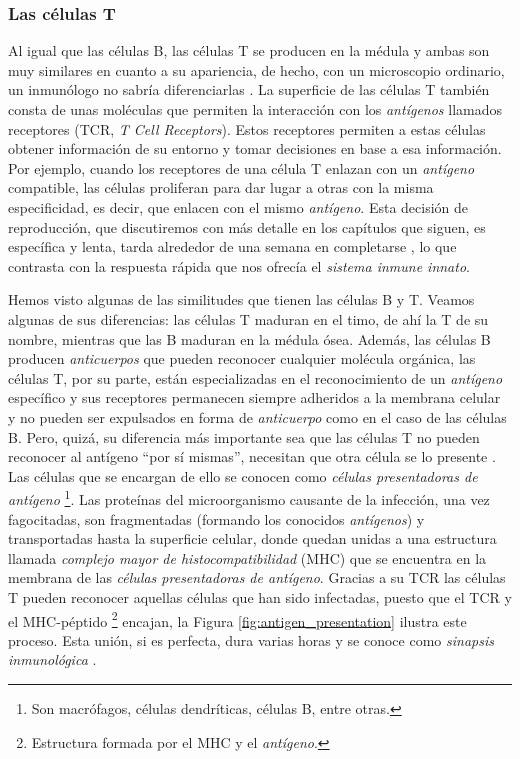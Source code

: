 \subsubsection{Las células T}
\label{Tcell}

Al igual que las células B, las células T se producen en la médula y ambas son muy similares en  cuanto a su apariencia, de hecho, con un microscopio ordinario, un inmunólogo no sabría diferenciarlas \citep{theHowItWorks}. La superficie de las células T también consta de unas moléculas que permiten la interacción con los \textit{antígenos} llamados receptores (TCR, \textit{T Cell Receptors}). Estos receptores permiten a estas células obtener información de su entorno y tomar decisiones en base a esa información. Por ejemplo, cuando los receptores de una célula T enlazan con un \textit{antígeno} compatible, las células proliferan para dar lugar a otras con la misma especificidad, es decir, que enlacen con el mismo \textit{antígeno}. Esta decisión de reproducción, que discutiremos con más detalle en los capítulos que siguen, es específica y lenta, tarda alrededor de una semana en completarse \citep{theHowItWorks}, lo que contrasta con la respuesta rápida que nos ofrecía el \textit{sistema inmune innato}.

Hemos visto algunas de las similitudes que tienen las células B y T. Veamos algunas de sus diferencias: las células T maduran en el timo, de ahí la T de su nombre, mientras que las B maduran en la médula ósea. Además, las células B producen \textit{anticuerpos} que pueden reconocer cualquier molécula orgánica, las células T, por su parte, están especializadas en el reconocimiento de un \textit{antígeno} específico y sus receptores permanecen siempre adheridos a la membrana celular y no pueden ser expulsados en forma de \textit{anticuerpo} como en el caso de las células B. Pero, quizá, su diferencia más importante sea que las células T no pueden reconocer al antígeno ``por sí mismas'', necesitan que otra célula se lo presente \citep{theHowItWorks}. Las células que se encargan de ello se conocen como \textit{células presentadoras de antígeno} \footnote{Son macrófagos, células dendríticas, células B, entre otras.}. Las proteínas del microorganismo causante de la infección, una vez fagocitadas, son fragmentadas (formando los conocidos \textit{antígenos}) y transportadas hasta la superficie celular, donde quedan unidas a una estructura llamada \textit{complejo mayor de histocompatibilidad} (MHC) que se encuentra en la membrana de las \textit{células presentadoras de antígeno}. Gracias a su TCR las células T pueden reconocer aquellas células que han sido infectadas, puesto que el TCR y el MHC-péptido \footnote{Estructura formada por el MHC y el \textit{antígeno}.} encajan, la Figura \ref{fig:antigen_presentation} ilustra este proceso. Esta unión, si es perfecta, dura varias horas y se conoce como \textit{sinapsis inmunológica} \citep{fernandez2012mecanica}.




